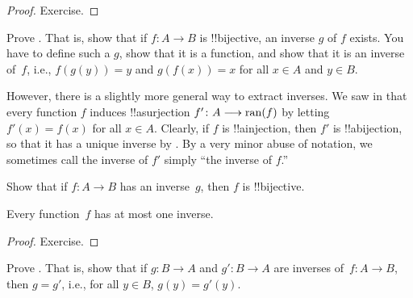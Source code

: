 \documentclass[../../../include/open-logic-section]{subfiles}
\begin{document}
\begin{proof}
Exercise.
\end{proof}

\begin{prob}
Prove . That is, show that if
$f\colon A \to B$ is !!{bijective}, an inverse $g$ of $f$ exists. You
have to define such a $g$, show that it is a function, and show that
it is an inverse of~$f$, i.e., $f(g(y)) = y$ and $g(f(x)) = x$ for all
$x \in A$ and $y \in B$.
\end{prob}

\begin{explain}
However, there is a slightly more general way to extract inverses. We
saw in  that every function $f$ induces
!!a{surjection} $f' \colon A \longrightarrow \mathrm{ran}(f)$ by letting $f'(x) = f(x)$
for all $x \in A$. Clearly, if $f$ is !!a{injection}, then $f'$ is
!!a{bijection}, so that it has a unique inverse by
. By a very minor abuse of notation, we
sometimes call the inverse of $f'$ simply ``the inverse of $f$.''
\end{explain}

\begin{prob}
Show that if $f\colon A \to B$ has an inverse~$g$, then $f$ is
!!{bijective}.
\end{prob}

\begin{prop}
Every function~$f$ has at most one inverse.
\end{prop}

\begin{proof}
Exercise.
\end{proof}

\begin{prob}
Prove . That is, show that
if $g\colon B \to A$ and $g'\colon B \to A$ are inverses of~$f\colon A
\to B$, then $g = g'$, i.e., for all $y \in B$, $g(y) = g'(y)$.
\end{prob}
\end{document}
